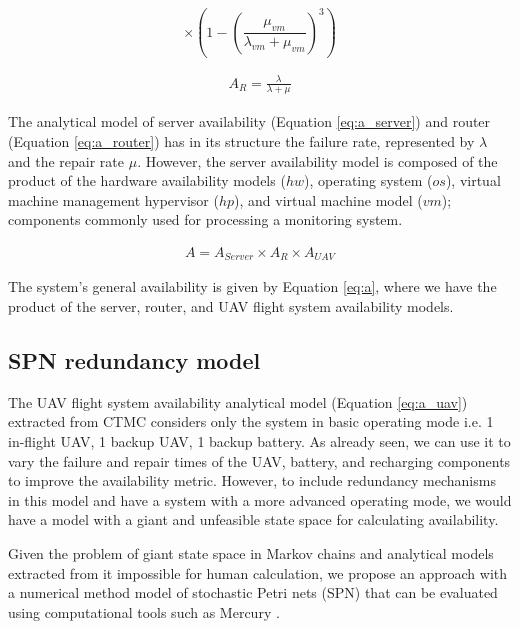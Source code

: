 \documentclass[conference]{IEEEtran}
\begin{document}
\[\times(1- (\frac{\mu_{vm}}{\lambda_{vm} + \mu_{vm}})^{3})\]

\begin{align}\label{eq:a_router}
A_{R} = \frac{\lambda}{\lambda + \mu} 
\end{align}

The analytical model of server availability (Equation \ref{eq:a_server}) and router (Equation \ref{eq:a_router}) has in its structure the failure rate, represented by $\lambda$ and the repair rate $\mu $. However, the server availability model is composed of the product of the hardware availability models ($hw$), operating system ($os$), virtual machine management hypervisor ($hp$), and virtual machine model ($ vm$); components commonly used for processing a monitoring system.

\begin{align}\label{eq:a}
A = A_{Server} \times A_{R}  \times A_{UAV}
\end{align}

The system's general availability is given by Equation \ref{eq:a}, where we have the product of the server, router, and UAV flight system availability models.

\subsection{SPN redundancy model}

The UAV flight system availability analytical model (Equation \ref{eq:a_uav}) extracted from CTMC considers only the system in basic operating mode i.e. 1 in-flight UAV, 1 backup UAV, 1 backup battery. As already seen, we can use it to vary the failure and repair times of the UAV, battery, and recharging components to improve the availability metric. However, to include redundancy mechanisms in this model and have a system with a more advanced operating mode, we would have a model with a giant and unfeasible state space for calculating availability.

Given the problem of giant state space in Markov chains and analytical models extracted from it impossible for human calculation, we propose an approach with a numerical method model of stochastic Petri nets (SPN) that can be evaluated using computational tools such as Mercury \cite{maciel2017mercury}.
\end{document}
